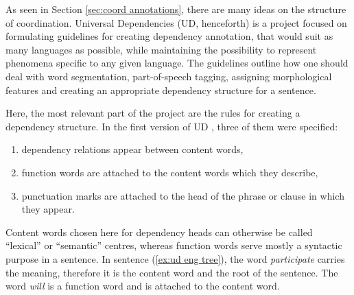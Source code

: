 As seen in Section \ref{sec:coord annotations}, there are many ideas on the structure of coordination. Universal Dependencies (UD, henceforth) is a project focused on formulating guidelines for creating dependency annotation, that would suit as many languages as possible, while maintaining the possibility to represent phenomena specific to any given language. The guidelines outline how one should deal with word segmentation, part-of-speech tagging, assigning morphological features and creating an appropriate dependency structure for a sentence. 

Here, the most relevant part of the project are the rules for creating a dependency structure. In the first version of UD \citep{ud1}, three of them were specified: 
\begin{enumerate}
    \item dependency relations appear between content words,
    \item function words are attached to the content words which they describe,
    \item punctuation marks are attached to the head of the phrase or clause in which they appear.
\end{enumerate}
Content words chosen here for dependency heads can otherwise be called ``lexical'' or ``semantic'' centres, whereas function words serve mostly a syntactic purpose in a sentence. In sentence (\ref{ex:ud eng tree}), the word \textsl{participate} carries the meaning, therefore it is the content word and the root of the sentence. The word \textsl{will} is a function word and is attached to the content word.

